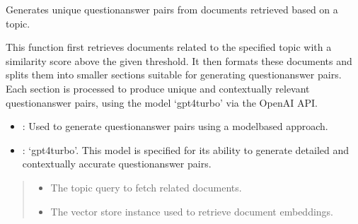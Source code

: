 \documentclass[letterpaper,10pt,english,openany,oneside]{sphinxmanual}
\begin{document}
\begin{fulllineitems}
\label{\detokenize{generation:tools.pipeline.generate_question_answer_pairs_open_ai_json}}
\pysigstartsignatures
{}
\pysigstopsignatures
\sphinxAtStartPar
Generates unique question\sphinxhyphen{}answer pairs from documents retrieved based on a topic.

\sphinxAtStartPar
This function first retrieves documents related to the specified topic with a similarity score above the given threshold.
It then formats these documents and splits them into smaller sections suitable for generating question\sphinxhyphen{}answer pairs.
Each section is processed to produce unique and contextually relevant question\sphinxhyphen{}answer pairs, using the model
‘gpt\sphinxhyphen{}4\sphinxhyphen{}turbo’ via the OpenAI API.
\begin{description}
\begin{itemize}
\item {} 
\sphinxAtStartPar
{}: Used to generate question\sphinxhyphen{}answer pairs using a model\sphinxhyphen{}based approach.

\item {} 
\sphinxAtStartPar
{}: ‘gpt\sphinxhyphen{}4\sphinxhyphen{}turbo’. This model is specified for its ability to generate detailed and contextually
accurate question\sphinxhyphen{}answer pairs.

\end{itemize}

\end{description}
\begin{quote}\begin{description}
\begin{itemize}
\item {} 
\sphinxAtStartPar
{} \textendash{} The topic query to fetch related documents.

\item {} 
\sphinxAtStartPar
{} \textendash{} The vector store instance used to retrieve document embeddings.


\end{itemize}
\end{description}
\end{quote}
\end{fulllineitems}
\end{document}
